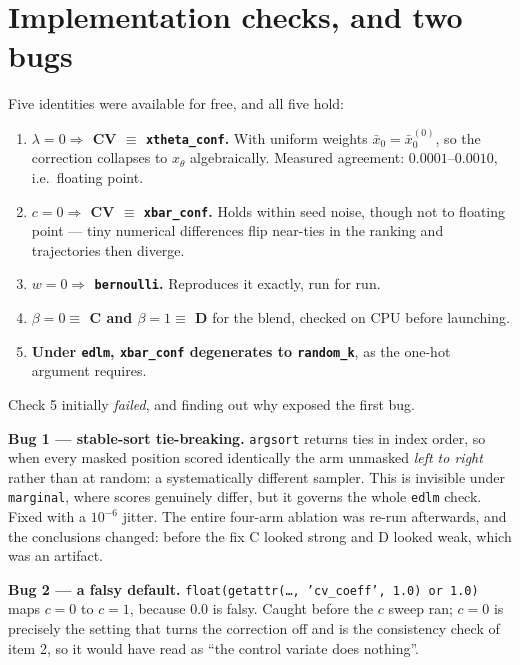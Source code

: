 \documentclass[11pt]{article}
\begin{document}
\section{Implementation checks, and two bugs}

Five identities were available for free, and all five hold:

\begin{enumerate}
  \item \textbf{$\lambda=0 \Rightarrow$ CV $\equiv$ \texttt{xtheta\_conf}.} With
        uniform weights $\bar{x}_0 = \bar{x}_0^{(0)}$, so the correction
        collapses to $x_\theta$ algebraically. Measured agreement:
        $0.0001$--$0.0010$, i.e.\ floating point.
  \item \textbf{$c=0 \Rightarrow$ CV $\equiv$ \texttt{xbar\_conf}.} Holds within
        seed noise, though not to floating point --- tiny numerical differences
        flip near-ties in the ranking and trajectories then diverge.
  \item \textbf{$w=0 \Rightarrow$ \texttt{bernoulli}.} Reproduces it exactly,
        run for run.
  \item \textbf{$\beta=0 \equiv$ C and $\beta=1 \equiv$ D} for the blend, checked
        on CPU before launching.
  \item \textbf{Under \texttt{edlm}, \texttt{xbar\_conf} degenerates to
        \texttt{random\_k}}, as the one-hot argument requires.
\end{enumerate}

Check 5 initially \emph{failed}, and finding out why exposed the first bug.

\textbf{Bug 1 --- stable-sort tie-breaking.} \texttt{argsort} returns ties in
index order, so when every masked position scored identically the arm unmasked
\emph{left to right} rather than at random: a systematically different sampler.
This is invisible under \texttt{marginal}, where scores genuinely differ, but it
governs the whole \texttt{edlm} check. Fixed with a $10^{-6}$ jitter. The entire
four-arm ablation was re-run afterwards, and the conclusions changed: before the
fix C looked strong and D looked weak, which was an artifact.

\textbf{Bug 2 --- a falsy default.} \texttt{float(getattr(\dots, 'cv\_coeff',
1.0) or 1.0)} maps $c=0$ to $c=1$, because $0.0$ is falsy. Caught before the $c$
sweep ran; $c=0$ is precisely the setting that turns the correction off and is
the consistency check of item 2, so it would have read as ``the control variate
does nothing''.
\end{document}
